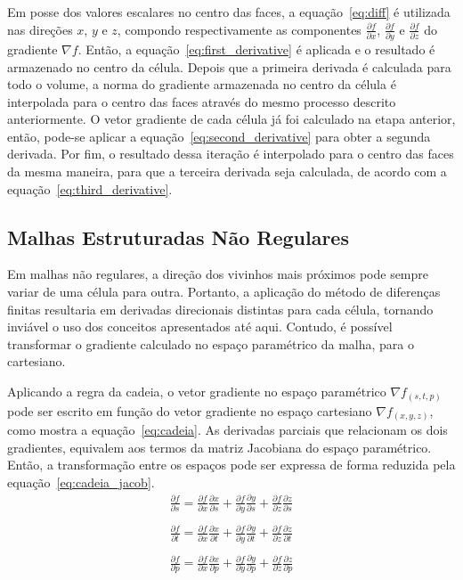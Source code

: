 	Em posse dos valores escalares no centro das faces, a equação~\eqref{eq:diff} é utilizada nas direções $ x $, $ y $ e $ z $, compondo respectivamente as componentes $ \frac{\partial f}{\partial x} $, $ \frac{\partial f}{\partial y} $ e $ \frac{\partial f}{\partial z} $ do gradiente $ \nabla f $. Então, a equação~\eqref{eq:first_derivative} é aplicada e o resultado é armazenado no centro da célula. Depois que a primeira derivada é calculada para todo o volume, a norma do gradiente armazenada no centro da célula é interpolada para o centro das faces através do mesmo processo descrito anteriormente. O vetor gradiente de cada célula já foi calculado na etapa anterior, então, pode-se aplicar a equação~\eqref{eq:second_derivative} para obter a segunda derivada. Por fim, o resultado dessa iteração é interpolado para o centro das faces da mesma maneira, para que a terceira derivada seja calculada, de acordo com a equação~\eqref{eq:third_derivative}.

\subsection{Malhas Estruturadas Não Regulares}
\label{subsec:my.nonstruct}
	Em malhas não regulares, a direção dos vivinhos mais próximos pode sempre variar de uma célula para outra. Portanto, a aplicação do método de diferenças finitas resultaria em derivadas direcionais distintas para cada célula, tornando inviável o uso dos conceitos apresentados até aqui. Contudo, é possível transformar o gradiente calculado no espaço paramétrico da malha, para o cartesiano.
	
	Aplicando a regra da cadeia, o vetor gradiente no espaço paramétrico $ \nabla f_{(s, t, p)} $ pode ser escrito em função do vetor gradiente no espaço cartesiano $ \nabla f_{(x, y, z)} $, como mostra a equação~\eqref{eq:cadeia}. As derivadas parciais que relacionam os dois gradientes, equivalem aos termos da matriz Jacobiana do espaço paramétrico. Então, a transformação entre os espaços pode ser expressa de forma reduzida pela equação~\eqref{eq:cadeia_jacob}.
	\\
	
\begin{equation}\label{eq:cadeia}
\begin{aligned}
	\frac{\partial f}{\partial s} = \frac{\partial f}{\partial x}\frac{\partial x}{\partial s} + \frac{\partial f}{\partial y}\frac{\partial y}{\partial s} + \frac{\partial f}{\partial z}\frac{\partial z}{\partial s}
	\\
	\\
	\frac{\partial f}{\partial t} = \frac{\partial f}{\partial x}\frac{\partial x}{\partial t} + \frac{\partial f}{\partial y}\frac{\partial y}{\partial t} + \frac{\partial f}{\partial z}\frac{\partial z}{\partial t}
	\\
	\\
	\frac{\partial f}{\partial p} = \frac{\partial f}{\partial x}\frac{\partial x}{\partial p} + \frac{\partial f}{\partial y}\frac{\partial y}{\partial p} + \frac{\partial f}{\partial z}\frac{\partial z}{\partial p}
\end{aligned}
\end{equation} \

